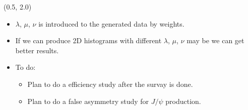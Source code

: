 \documentclass[10pt, xcolor={dvipsnames}, aspectratio = 169, sans,mathserif]{beamer}
\begin{document}
\begin{frame}

\begin{textblock}{15.0}(0.5, 2.0)
\begin{itemize}

    \item $\lambda$, $\mu$, $\nu$ is introduced to the generated data by weights.

    \item If we can produce 2D histograms with different $\lambda$, $\mu$, $\nu$ may be we can get better results.

    \item To do:

    \begin{itemize}

        \item Plan to do a efficiency study after the survay is done.

        \item Plan to do a false asymmetry study for $J/\psi$ production.
    \end{itemize}

\end{itemize}
\end{textblock}

\end{frame}
\end{document}
